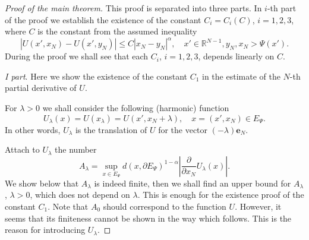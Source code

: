 \documentclass[10pt]{amsart}
\theoremstyle{definition}
\numberwithin{equation}{section}
\begin{document}
\begin{proof}[Proof of the main theorem]
This proof is separated into three parts. In $i$-th part of the proof we establish       the existence  of the  constant
$C_i = C_i (C)$, $i=1,2,3$, where $C$ is the constant from the  assumed  inequality
\begin{equation}\label{EQ.VERTICAL}
|U(x', x_N) - U (x', y_N)| \le C |x_N- y_N|^\alpha,\quad  x'\in \mathbb{R}^{N-1}, y_N, x_N>\Psi (x').
\end{equation}
During the proof  we  shall see that each   $C_i$, $i=1,2,3$,   depends  linearly  on $C$.

\textit{I part}.
Here we show the existence of the constant  $C_1$        in  the estimate of the  $N$-th  partial  derivative   of  $U$.

For  $\lambda > 0$  we  shall  consider  the following  (harmonic)  function
\begin{equation*}
U _\lambda(x) =  U(x_\lambda )  =  U (x', x_N + \lambda),\quad x  = (x',x_N) \in E_\Psi.
\end{equation*}
In  other  words,  $U_\lambda$ is the   translation of $U$ for the vector $(-\lambda) \mathbf{e}_N$.

Attach to  $U_\lambda$  the  number
\begin{equation}\label{EQ.ALAMBDA}
A_\lambda  = \sup _{x \in E_\Psi} d (x, \partial E_\Psi )^{1 - \alpha}
\left| \frac {\partial} {\partial x_N} U_\lambda (x)\right|.
\end{equation}
We show below  that $A_\lambda$ is indeed finite, then we shall find an upper bound for $A_\lambda$, $\lambda>0$,  which
does not depend on $\lambda$. This is enough for the existence proof of the constant $C_1$.       Note that $A_0$ should
correspond to the function $U$.     However, it  seems  that  its finiteness  cannot be shown  in the way which follows.
This  is the reason for  introducing  $U_\lambda$.


\end{proof}
\end{document}
